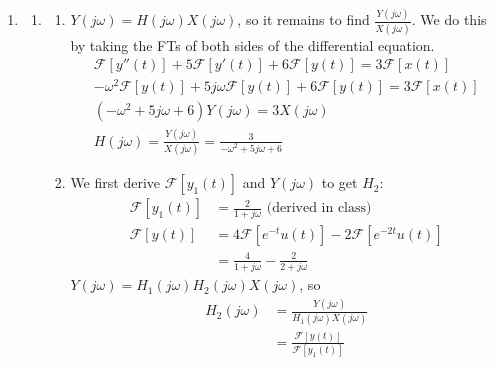 \documentclass[12pt]{article}
\begin{document}
\begin{enumerate}
      \item \begin{enumerate}
                  \item \begin{enumerate}
                              \item $Y(j\omega)=H(j\omega)X(j\omega)$, so it remains to find $\frac{Y(j\omega)}{X(j\omega)}$.
                                    We do this by taking the FTs of both sides of the differential equation.
                                    \begin{gather*}
                                          \mathcal{F}[y''(t)]+5\mathcal{F}[y'(t)]+6\mathcal{F}[y(t)]=3\mathcal{F}[x(t)] \\
                                          -\omega^2\mathcal{F}[y(t)]+5j\omega\mathcal{F}[y(t)]+6\mathcal{F}[y(t)]=3\mathcal{F}[x(t)] \\
                                          (-\omega^2+5j\omega+6)Y(j\omega)=3X(j\omega) \\
                                          H(j\omega)=\frac{Y(j\omega)}{X(j\omega)}=\boxed{\frac{3}{-\omega^2+5j\omega+6}}
                                    \end{gather*}
                              \item We first derive $\mathcal{F}[y_1(t)]$ and $Y(j\omega)$ to get $H_2$:
                                    \begin{align*}
                                          \mathcal{F}[y_1(t)] & =\frac{2}{1+j\omega}\text{ (derived in class)}                            \\
                                          \mathcal{F}[y(t)]
                                                              & =4\mathcal{F}\left[e^{-t}u(t)\right]-2\mathcal{F}\left[e^{-2t}u(t)\right] \\
                                                              & = \frac{4}{1+j\omega}-\frac{2}{2+j\omega}
                                    \end{align*}
                                    $Y(j\omega)=H_1(j\omega)H_2(j\omega)X(j\omega)$, so
                                    \begin{align*}
                                          H_2(j\omega)          & = \frac{Y(j\omega)}{H_1(j\omega)X(j\omega)}                           \\
                                                                & = \frac{\mathcal{F}[y(t)]}{\mathcal{F}[y_1(t)]}                       \\

\end{align*}
\end{enumerate}
\end{enumerate}
\end{enumerate}
\end{document}
